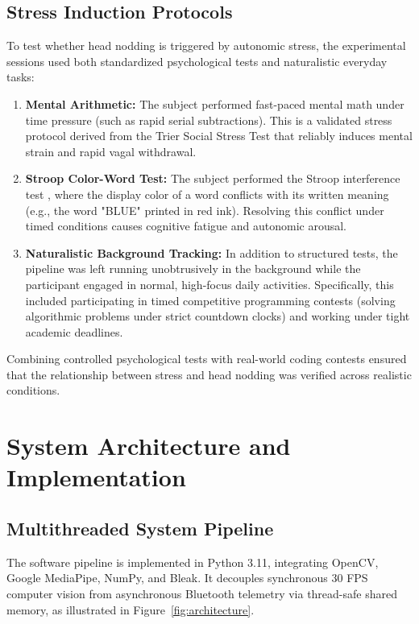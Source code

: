 \documentclass[12pt,a4paper,oneside]{report}
\begin{document}
\section{Stress Induction Protocols}
To test whether head nodding is triggered by autonomic stress, the experimental sessions used both standardized psychological tests and naturalistic everyday tasks:

\begin{enumerate}[leftmargin=1.5cm, label=\textbf{\arabic*.}]
    \item \textbf{Mental Arithmetic:} The subject performed fast-paced mental math under time pressure (such as rapid serial subtractions). This is a validated stress protocol derived from the Trier Social Stress Test \cite{kirschbaum1993} that reliably induces mental strain and rapid vagal withdrawal.
    
    \item \textbf{Stroop Color-Word Test:} The subject performed the Stroop interference test \cite{stroop1935, kim2018}, where the display color of a word conflicts with its written meaning (e.g., the word "BLUE" printed in red ink). Resolving this conflict under timed conditions causes cognitive fatigue and autonomic arousal.
    
    \item \textbf{Naturalistic Background Tracking:} In addition to structured tests, the pipeline was left running unobtrusively in the background while the participant engaged in normal, high-focus daily activities. Specifically, this included participating in timed competitive programming contests (solving algorithmic problems under strict countdown clocks) and working under tight academic deadlines.
\end{enumerate}
Combining controlled psychological tests with real-world coding contests ensured that the relationship between stress and head nodding was verified across realistic conditions.




\chapter{System Architecture and Implementation}
\label{chap:implementation}

\section{Multithreaded System Pipeline}
The software pipeline is implemented in Python 3.11, integrating OpenCV, Google MediaPipe, NumPy, and Bleak. It decouples synchronous 30 FPS computer vision from asynchronous Bluetooth telemetry via thread-safe shared memory, as illustrated in Figure~\ref{fig:architecture}.
\end{document}
